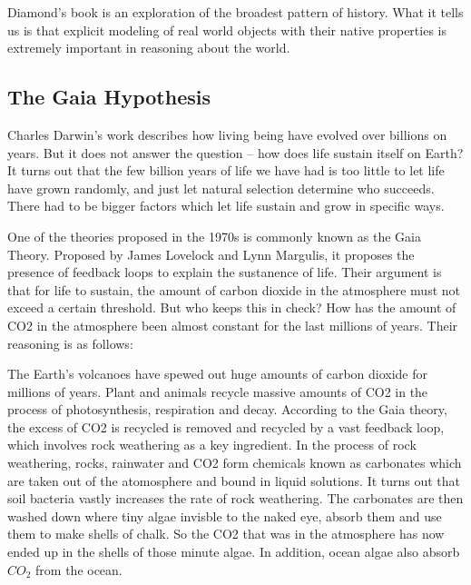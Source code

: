 

Diamond's book is an exploration of the broadest pattern of history. What it tells us is that explicit modeling of real world objects with their native properties is extremely important in reasoning about the world.

\subsection{The Gaia Hypothesis}
Charles Darwin's work describes how living being have evolved over billions on years. But it does not answer the question -- how does life sustain itself on Earth? It turns out that the few billion years of life we have had is too little to let life have grown randomly, and just let natural selection determine who succeeds. There had to be bigger factors which let life sustain and grow in specific ways.

One of the theories proposed in the 1970s is commonly known as the Gaia Theory. Proposed by James Lovelock and Lynn Margulis, it proposes the presence of feedback loops to explain the sustanence of life. Their argument is that for life to sustain, the amount of carbon dioxide in the atmosphere must not exceed a certain threshold. But who keeps this in check? How has the amount of CO2 in the atmosphere been almost constant for the last millions of years. Their reasoning is as follows:

The Earth's volcanoes have spewed out huge amounts of carbon dioxide for millions of years. Plant and animals recycle massive amounts of CO2 in the process of photosynthesis, respiration and decay. According to the Gaia theory, the excess of CO2 is recycled is removed and recycled by a vast feedback loop, which involves rock weathering as a key ingredient. In the process of rock weathering, rocks, rainwater and CO2 form chemicals known as carbonates which are taken out of the atomosphere and bound in liquid solutions. It turns out that soil bacteria vastly increases the rate of rock weathering. The carbonates are then washed down where tiny algae invisble to the naked eye, absorb them and use them to make shells of chalk. So the CO2 that was in the atmosphere has now ended up in the shells of those minute algae. In addition, ocean algae also absorb $CO_2$ from the ocean.  

